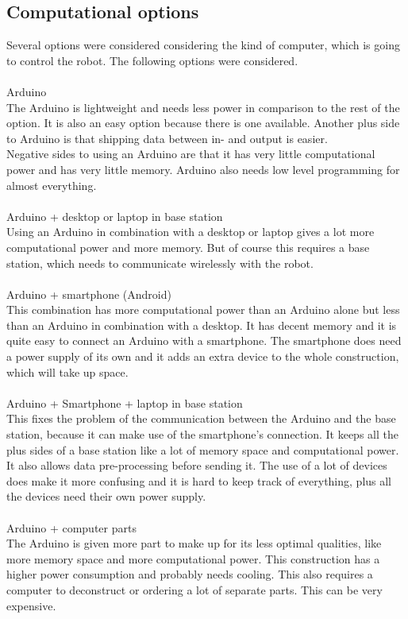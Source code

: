 \documentclass[11pt,twoside,a4paper]{report}
\begin{document}
\subsection{Computational options}
Several options were considered considering the kind of computer, which is going to control the robot. The following options were considered. \\
\\
Arduino\\
The Arduino is lightweight and needs less power in comparison to the rest of the option. It is also an easy option because there is one available. Another plus side to Arduino is that shipping data between in- and output is easier. \\
Negative sides to using an Arduino are that it has very little computational power and has very little memory. Arduino also needs low level programming for almost everything.\\
\\
Arduino + desktop or laptop in base station\\
Using an Arduino in combination with a desktop or laptop gives a lot more computational power and more memory. But of course this requires a base station, which needs to communicate wirelessly with the robot. \\
\\
Arduino + smartphone (Android)\\
This combination has more computational power than an Arduino alone but less than an Arduino in combination with a desktop. It has decent memory and it is quite easy to connect an Arduino with a smartphone. The smartphone does need a power supply of its own and it adds an extra device to the whole construction, which will take up space.\\
\\
Arduino + Smartphone + laptop in base station\\
This fixes the problem of the communication between the Arduino and the base station, because it can make use of the smartphone’s connection. It keeps all the plus sides of a base station like a lot of memory space and computational power. It also allows data pre-processing before sending it. The use of a lot of devices does make it more confusing and it is hard to keep track of everything, plus all the devices need their own power supply.\\ 
\\
Arduino + computer parts\\
The Arduino is given more part to make up for its less optimal qualities, like more memory space and more computational power. This construction has a higher power consumption and probably needs cooling. This also requires a computer to deconstruct or ordering a lot of separate parts. This can be very expensive.\\
\end{document}
